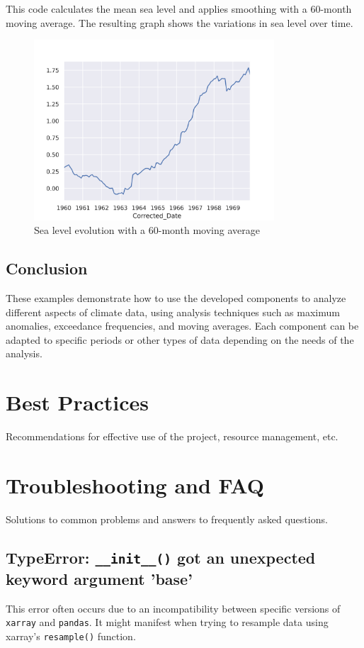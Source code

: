 \documentclass[a4paper,12pt]{article}
\begin{document}
This code calculates the mean sea level and applies smoothing with a 60-month moving average. The resulting graph shows the variations in sea level over time.

\begin{figure}[htbp]
\centering
\includegraphics[width=0.8\textwidth]{sealevel_example.png}
\caption{Sea level evolution with a 60-month moving average}
\end{figure}

\subsection*{Conclusion}

These examples demonstrate how to use the developed components to analyze different aspects of climate data, using analysis techniques such as maximum anomalies, exceedance frequencies, and moving averages. Each component can be adapted to specific periods or other types of data depending on the needs of the analysis.

\section{Best Practices}
\label{sec:best-practices}
Recommendations for effective use of the project, resource management, etc.

\section{Troubleshooting and FAQ}
\label{sec:faq}
Solutions to common problems and answers to frequently asked questions.

\subsection{TypeError: \texttt{\_\_init\_\_()} got an unexpected keyword argument 'base'}
This error often occurs due to an incompatibility between specific versions of \texttt{xarray} and \texttt{pandas}. It might manifest when trying to resample data using xarray’s \texttt{resample()} function.
\end{document}
